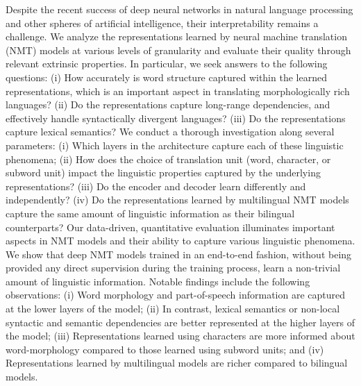 Despite the recent success of deep neural networks in natural language processing and other spheres of artificial intelligence, their interpretability remains a challenge. We analyze the representations learned by neural machine translation (NMT) models at various levels of granularity and evaluate their quality through relevant extrinsic properties. In particular, we seek answers to the following questions: (i) How accurately is word structure captured within the learned representations, which is an important aspect in translating morphologically rich languages? (ii) Do the representations capture long-range dependencies, and effectively handle syntactically divergent languages? (iii) Do the representations capture lexical semantics? We conduct a thorough investigation along several parameters: (i) Which layers in the architecture capture each of these linguistic phenomena; (ii) How does the choice of translation unit (word, character, or subword unit) impact the linguistic properties captured by the underlying representations? (iii) Do the encoder and decoder learn differently and independently? (iv) Do the representations learned by multilingual NMT models capture the same amount of linguistic information as their bilingual counterparts? Our data-driven, quantitative evaluation illuminates important aspects in NMT models and their ability to capture various linguistic phenomena. We show that deep NMT models trained in an end-to-end fashion, without being provided any direct supervision during the training process, learn a non-trivial amount of linguistic information. Notable findings include the following observations: (i) Word morphology and part-of-speech information are captured at the lower layers of the model; (ii) In contrast, lexical semantics or non-local syntactic and semantic dependencies are better represented at the higher layers of the model; (iii) Representations learned using characters are more informed about word-morphology compared to those learned using subword units; and (iv) Representations learned by multilingual models are richer compared to bilingual models. 